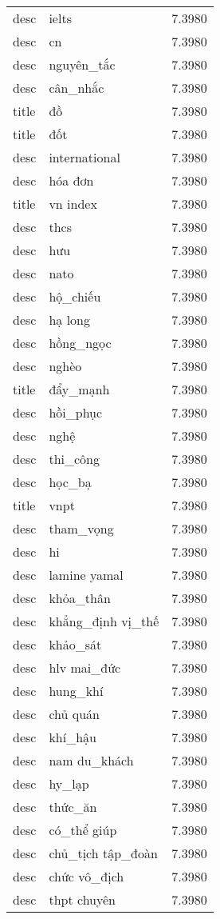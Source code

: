 \documentclass{article}
\begin{document}
\begin{tabular}{lll}
desc & ielts & 7.3980\\
desc & cn & 7.3980\\
desc & nguyên\_tắc & 7.3980\\
desc & cân\_nhắc & 7.3980\\
title & đồ & 7.3980\\
title & đốt & 7.3980\\
desc & international & 7.3980\\
desc & hóa đơn & 7.3980\\
title & vn index & 7.3980\\
desc & thcs & 7.3980\\
desc & hưu & 7.3980\\
desc & nato & 7.3980\\
desc & hộ\_chiếu & 7.3980\\
desc & hạ long & 7.3980\\
desc & hồng\_ngọc & 7.3980\\
desc & nghèo & 7.3980\\
title & đẩy\_mạnh & 7.3980\\
desc & hồi\_phục & 7.3980\\
desc & nghệ & 7.3980\\
desc & thi\_công & 7.3980\\
desc & học\_bạ & 7.3980\\
title & vnpt & 7.3980\\
desc & tham\_vọng & 7.3980\\
desc & hi & 7.3980\\
desc & lamine yamal & 7.3980\\
desc & khỏa\_thân & 7.3980\\
desc & khẳng\_định vị\_thế & 7.3980\\
desc & khảo\_sát & 7.3980\\
desc & hlv mai\_đức & 7.3980\\
desc & hung\_khí & 7.3980\\
desc & chủ quán & 7.3980\\
desc & khí\_hậu & 7.3980\\
desc & nam du\_khách & 7.3980\\
desc & hy\_lạp & 7.3980\\
desc & thức\_ăn & 7.3980\\
desc & có\_thể giúp & 7.3980\\
desc & chủ\_tịch tập\_đoàn & 7.3980\\
desc & chức vô\_địch & 7.3980\\
desc & thpt chuyên & 7.3980\\

\end{tabular}
\end{document}
